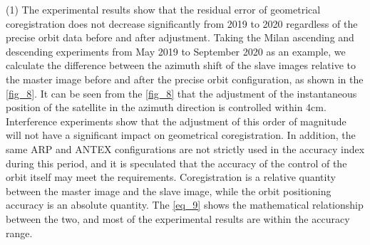 \documentclass[a4paper,fleqn]{cas-sc}
\begin{document}
(1) The experimental results show that the residual error of geometrical coregistration does not decrease significantly from 2019 to 2020 regardless of the precise orbit data before and after adjustment. Taking the Milan ascending and descending experiments from May 2019 to September 2020 as an example, we calculate the difference between the azimuth shift of the slave images relative to the master image before and after the precise orbit configuration, as shown in the \ref{fig_8}. It can be seen from the \ref{fig_8} that the adjustment of the instantaneous position of the satellite in the azimuth direction is controlled within 4cm. Interference experiments show that the adjustment of this order of magnitude will not have a significant impact on geometrical coregistration. In addition, the same ARP and ANTEX configurations are not strictly used in the accuracy index during this period, and it is speculated that the accuracy of the control of the orbit itself may meet the requirements. Coregistration is a relative quantity between the master image and the slave image, while the orbit positioning accuracy is an absolute quantity. The \ref{eq_9} shows the mathematical relationship between the two, and most of the experimental results are within the accuracy range. \par
\end{document}
